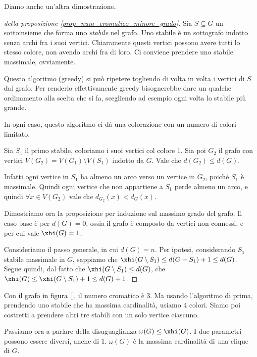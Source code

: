 	Diamo anche un'altra dimostrazione.
	\begin{proof}[della proposizione \ref{prop_num_cromatico_minore_grado}]
		Sia $S \subseteq G$ un sottoinsieme che forma uno \emph{stabile} nel grafo.
		Uno stabile \`e un sottografo indotto senza archi fra i suoi vertici.
		Chiaramente questi vertici possono avere tutti lo stesso colore, non avendo archi fra di loro.
		Ci conviene prendere uno stabile massimale, ovviamente.

		Questo algoritmo (greedy) si pu\`o ripetere togliendo di volta in volta i vertici di $S$ dal grafo.
		Per renderlo effettivamente greedy bisognerebbe dare un qualche ordinamento alla scelta che si fa, scegliendo ad esempio ogni volta lo stabile pi\`u grande.

		In ogni caso, questo algoritmo ci d\`a una colorazione con un numero di colori limitato.

		Sia $S_1$ il primo stabile, coloriamo i suoi vertici col colore 1.
		Sia poi $G_2$ il grafo con vertici $V(G_2) = V(G_1) \setminus V(S_1)$ indotto da $G$.
		Vale che $d(G_2) \le d(G)$.

		Infatti ogni vertice in $S_1$ ha almeno un arco verso un vertice in $G_2$, poich\'e $S_1$ \`e massimale.
		Quindi ogni vertice che non appartiene a $S_1$ perde almeno un arco, e quindi $\forall x \in V(G_2)$ vale che $d_{G_2}(x) < d_G (x)$.

		Dimostriamo ora la proposizione per induzione sul massimo grado del grafo.
		Il caso base \`e per $d(G) = 0$, ossia il grafo \`e composto da vertici non connessi, e per cui vale $\xhi(G) = 1$.

		Consideriamo il passo generale, in cui $d(G) = n$.
		Per ipotesi, considerando $S_1$ stabile massimale in $G$, sappiamo che $\xhi(G \setminus S_1) \le d(G - S_1) + 1 \le d(G)$.
		Segue quindi, dal fatto che $\xhi(G \setminus S_1) \le d(G)$, che $\xhi(G) \le \xhi(G \setminus S_1) + 1 \le d(G) + 1$.
	\end{proof}


	Con il grafo in figura \ref{}, il numero cromatico \`e 3.
	Ma usando l'algoritmo di prima, prendendo uno stabile che ha massima cardinalit\`a, usiamo 4 colori.
	Siamo poi costretti a prendere altri tre stabili con un solo vertice ciascuno.

	Passiamo ora a parlare della disuguaglianza $\omega(G) \le \xhi(G)$.
	I due parametri possono essere diversi, anche di 1.
	$\omega(G)$ \`e la massima cardinalit\`a di una clique di $G$.

